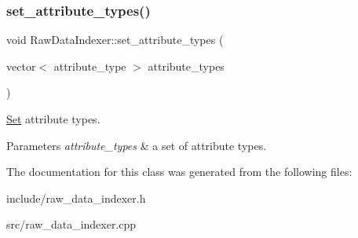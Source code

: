 \subsubsection{\texorpdfstring{set\+\_\+attribute\+\_\+types()}{set\_attribute\_types()}}
{\footnotesize\ttfamily void Raw\+Data\+Indexer\+::set\+\_\+attribute\+\_\+types (\begin{DoxyParamCaption}\item[{vector$<$ attribute\+\_\+type $>$}]{attribute\+\_\+types }\end{DoxyParamCaption})}

\hyperlink{classSet}{Set} attribute types. 
\begin{DoxyParams}{Parameters}
{\em attribute\+\_\+types} & a set of attribute types. \\
\hline
\end{DoxyParams}


The documentation for this class was generated from the following files\+:\begin{DoxyCompactItemize}
\item 
include/raw\+\_\+data\+\_\+indexer.\+h\item 
src/raw\+\_\+data\+\_\+indexer.\+cpp\end{DoxyCompactItemize}
